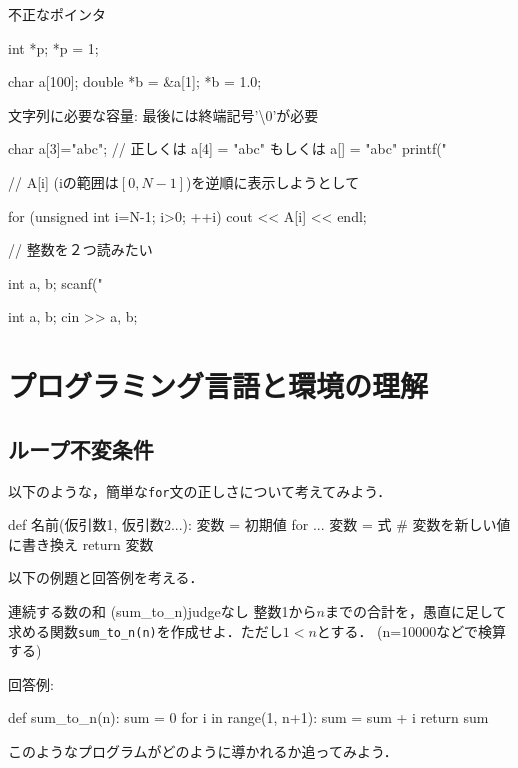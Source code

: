 不正なポインタ
\begin{cbox}
int *p;
*p = 1;  

char a[100];
double *b = &a[1];
*b = 1.0;
\end{cbox}

文字列に必要な容量: 最後には終端記号'\textbackslash{}0'が必要
\begin{cbox}  
    char a[3]="abc"; // 正しくは a[4] = "abc" もしくは a[] = "abc"
    printf("
\end{cbox}

// A[i] (iの範囲は$[0,N-1]$)を逆順に表示しようとして
\begin{cbox}
for (unsigned int i=N-1; i>0; ++i)
  cout << A[i] << endl;
\end{cbox}


// 整数を２つ読みたい
\begin{purecbox}
int a, b;
scanf("
\end{purecbox}
\begin{cbox}
int a, b;
cin >> a, b;
\end{cbox}


\chapter{プログラミング言語と環境の理解}
\section{ループ不変条件}\label{chapter:loop-invariants}


以下のような，簡単な\texttt{for}文の正しさについて考えてみよう．

\begin{terminal}[emph={}]
def 名前(仮引数1, 仮引数2...):
    変数 = 初期値
    for ...
      変数 = 式 # 変数を新しい値に書き換え
    return 変数
\end{terminal}

以下の例題と回答例を考える．

\begin{psbox}{連続する数の和 (sum\_to\_n)}{judgeなし}
  整数1から$n$までの合計を，愚直に足して求める関数\texttt{sum\_to\_n(n)}を作成せよ．ただし$1<n$とする．
  (n=10000などで検算する)
\end{psbox}

回答例:
\begin{pybox}
def sum_to_n(n):
    sum = 0
    for i in range(1, n+1):
        sum = sum + i
    return sum
\end{pybox}
このようなプログラムがどのように導かれるか追ってみよう．

